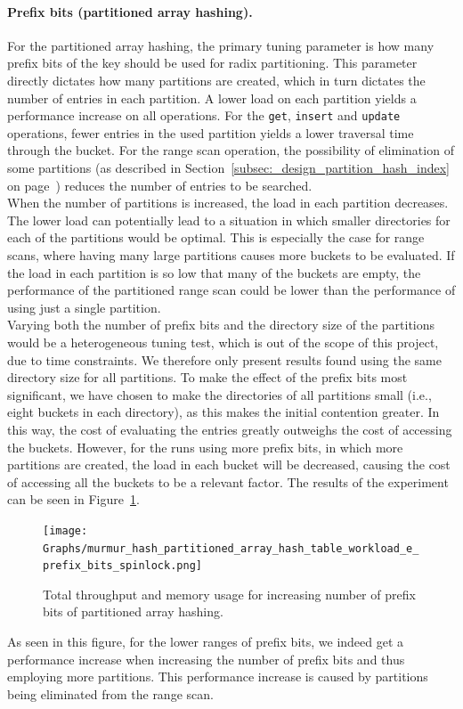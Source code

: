 \documentclass[11pt]{article} %
\begin{document}
\paragraph{Prefix bits (partitioned array hashing).} For the partitioned array hashing, the primary tuning parameter is how many prefix bits of the key should be used for radix partitioning. This parameter directly dictates how many partitions are created, which in turn dictates the number of entries in each partition. A lower load on each partition yields a performance increase on all operations. For the \verb|get|, \verb|insert| and \verb|update| operations, fewer entries in the used partition yields a lower traversal time through the bucket. For the range scan operation, the possibility of elimination of some partitions (as described in Section~\ref{subsec:_design_partition_hash_index} on page~\pageref{subsec:_design_partition_hash_index}) reduces the number of entries to be searched. \\

When the number of partitions is increased, the load in each partition decreases. The lower load can potentially lead to a situation in which smaller directories for each of the partitions would be optimal. This is especially the case for range scans, where having many large partitions causes more buckets to be evaluated. If the load in each partition is so low that many of the buckets are empty, the performance of the partitioned range scan could be lower than the performance of using just a single partition.\\

Varying both the number of prefix bits and the directory size of the partitions would be a heterogeneous tuning test, which is out of the scope of this project, due to time constraints. We therefore only present results found using the same directory size for all partitions. To make the effect of the prefix bits most significant, we have chosen to make the directories of all partitions small (i.e., eight buckets in each directory), as this makes the initial contention greater. In this way, the cost of evaluating the entries  greatly outweighs the cost of accessing the buckets. However, for the runs using more prefix bits, in which more partitions are created, the load in each bucket will be decreased, causing the cost of accessing all the buckets to be a relevant factor. The results of the experiment can be seen in Figure~\ref{fig:prefix_bits}.

\begin{figure}[H]
  \centering
  \texttt{[image: Graphs/murmur\_hash\_partitioned\_array\_hash\_table\_workload\_e\_prefix\_bits\_spinlock.png]}\\
  \caption{Total throughput and memory usage for increasing number of prefix bits of partitioned array hashing.}\label{fig:prefix_bits}
\end{figure}
As seen in this figure, for the lower ranges of prefix bits, we indeed get a performance increase when increasing the number of prefix bits and thus employing more partitions. This performance increase is caused by partitions being eliminated from the range scan. 
\end{document}
